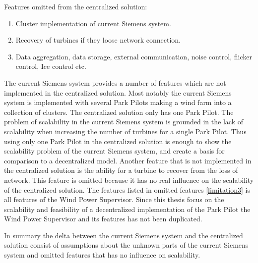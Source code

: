 Features omitted from the centralized solution:

\begin{enumerate}
	\item \label{limitation1} Cluster implementation of current Siemens system.
	\item \label{limitation2} Recovery of turbines if they loose network connection.
	\item \label{limitation3}Data aggregation, data storage, external communication, noise control, flicker control, Ice control etc.
\end{enumerate}

The current Siemens system provides a number of features which are not implemented in the centralized solution. Most notably the current Siemens system is implemented with several Park Pilots making a wind farm into a collection of clusters. The centralized solution only has one Park Pilot. The problem of scalability in the current Siemens system is grounded in the lack of scalability when increasing the number of turbines for a single Park Pilot. Thus using only one Park Pilot in the centralized solution is enough to show the scalability problem of the current Siemens system, and create a basis for comparison to a decentralized model.
Another feature that is not implemented in the centralized solution is the ability for a turbine to recover from the loss of network. This feature is omitted because it has no real influence on the scalability of the centralized solution.
The features listed in omitted features \ref{limitation3} is all features of the Wind Power Supervisor. Since this thesis focus on the scalability and feasibility of a decentralized implementation of the Park Pilot the Wind Power Supervisor and its features has not been duplicated.

In summary the delta between the current Siemens system and the centralized solution consist of assumptions about the unknown parts of the current Siemens system and omitted features that has no influence on scalability.

